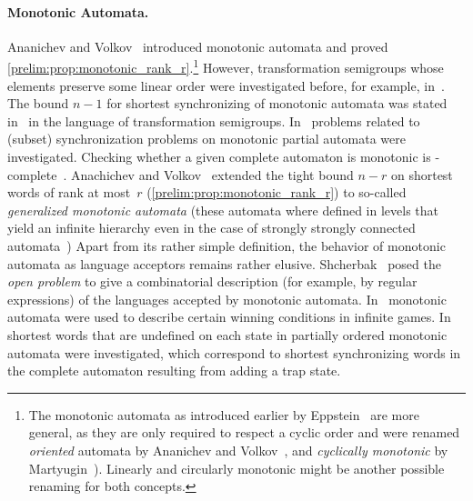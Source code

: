 \paragraph{Monotonic Automata.} Ananichev and Volkov~\cite{DBLP:journals/tcs/AnanichevV04} introduced monotonic automata
and proved \cref{prelim:prop:monotonic_rank_r}.\footnote{The monotonic automata as introduced earlier 
	by Eppstein~\cite{Eppstein90} are more general, as they are only required to respect a cyclic order and were
	renamed \emph{oriented} automata by Ananichev and Volkov~\cite{DBLP:journals/tcs/AnanichevV04},
and \emph{cyclically monotonic} by Martyugin~\cite{Mar2009b}). Linearly and circularly monotonic might be another
	possible renaming for both concepts.}
However, transformation semigroups whose elements preserve some linear order
were investigated before, for example, in~\cite{Howie1971}.
The bound $n - 1$ for shortest synchronizing of monotonic automata
was stated in~\cite{AnanichevVolkov04} in the language of transformation semigroups.
In~\cite{RyzhikovS18} problems related to (subset) synchronization problems
on monotonic partial automata were investigated.
Checking whether a given complete automaton is monotonic is \NP-complete~\cite{Szykula15}.
Anachichev and Volkov~\cite{AnanichevV05}
extended the tight bound $n-r$ on shortest words of rank at most~$r$ (\cref{prelim:prop:monotonic_rank_r})
to so-called \emph{generalized monotonic automata}
(these automata where defined in levels 
that yield an infinite hierarchy even in the case of strongly strongly connected 
automata~\cite{AlmeidaCardoso13})
Apart from its rather simple definition,
the behavior of monotonic automata as language acceptors 
remains rather elusive. Shcherbak~\cite{Shcherbak05} posed
the \emph{open problem} to give a combinatorial description (for example, by
regular expressions) of the languages accepted by monotonic automata.
In~\cite{DBLP:conf/icalp/Kopczynski06,Kopczynski08} monotonic
automata were used to describe certain winning conditions in infinite games.
In~\cite{DBLP:conf/dlt/Ananichev05} shortest words that are undefined on each state
in partially ordered monotonic automata were investigated,
which correspond to shortest synchronizing words in the complete automaton
resulting from adding a trap state.


